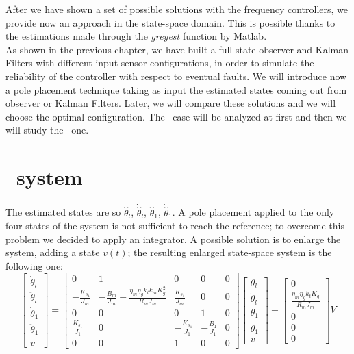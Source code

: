 
After we have shown a set of possible solutions with the frequency controllers, we provide now an approach in the state-space domain. This is possible thanks to the estimations made through the \textit{greyest} function by Matlab.\\
As shown in the previous chapter, we have built a full-state observer and Kalman Filters with different input sensor configurations, in order to simulate the reliability of the controller with respect to eventual faults. We will introduce now a pole placement technique taking as input the estimated states coming out from observer or Kalman Filters. Later, we will compare these solutions and we will choose the optimal configuration. The \onedof\ case will be analyzed at first and then we will study the \twodof\ one.

\section{\onedof\ system}
The estimated states are so $\hat\theta_l$, $\dot{\hat\theta}_l$, $\hat\theta_1$, $\dot{\hat\theta}_1$. 
A pole placement applied to the only four states of the system is not sufficient to reach the reference; to overcome this problem we decided to apply an integrator. A possible solution is to enlarge the system, adding a state $v(t)$; the resulting enlarged state-space system is the following one:
\begin{equation}
	\begin{bmatrix}
		\dot\theta_l \\
		\ddot\theta_l \\
		\dot\theta_1 \\
		\ddot\theta_1 \\
		\dot{v}
	\end{bmatrix}
	=
	\begin{bmatrix}
		0 &1 & 0 & 0 & 0 \\
		-\frac{K_{s_1}}{J_m} & -\frac{B_m}{J_m}-\frac{\eta_m \eta_g k_t k_m K^2_g}{R_m J_m}  & \frac{K_{s_1}}{J_m} & 0 & 0 \\
		0 & 0 & 0 & 1 & 0 \\
		\frac{K_{s_1}}{J_1} & 0 & -\frac{K_{s_1}}{J_1} & -\frac{B_1}{J_1} & 0 \\
		0 & 0 & 1 & 0 & 0 
	\end{bmatrix}
	\begin{bmatrix}
		\theta_l \\
		\dot\theta_l \\
		\theta_1 \\
		\dot\theta_1 \\
		v
	\end{bmatrix}
	+
	\begin{bmatrix}
		0 \\
		\frac{\eta_m \eta_g k_t K_g}{R_m J_m} \\
		0 \\
		0 \\
		0
	\end{bmatrix}
	V
\end{equation}

